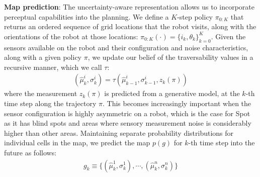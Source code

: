 \documentclass[letterpaper, 10pt, conference]{ieeeconf}      %
\newcommand{\ph}[1]{{\textbf{#1}:}} %
\newcommand{\rev}[1]{{\color{blue}#1}} %
\begin{document}
\ph{Map prediction}
The uncertainty-aware representation allows us to incorporate perceptual capabilities %
into the planning. We define a $K$-step policy \rev{$\pi_{0:K}$ that returns} an ordered sequence of grid locations that the robot visits, along with the orientations of the robot at those locations: \rev{$\pi_{0:K}(\cdot)=\{i_k, \theta_k\}_{k=0}^K$}. Given the sensors available on the robot and their configuration and noise characteristics, along with a given policy $\pi$, we update our belief of the traversability values in a recursive manner, which we call $\tau$:
\begin{align}
 (\hat{\mu}^i_k, \sigma^i_k) =\tau(\hat{\mu}^i_{k-1}, \sigma^i_{k-1}, z_{k}(\pi) )
\end{align}
where the measurement $z_k(\pi)$ is predicted from a generative model, at the $k$-th time step along the trajectory $\pi$. This becomes increasingly important when the sensor configuration is highly asymmetric on a robot, which is the case for Spot as it has blind spots and areas where sensory measurement noise is considerably higher than other areas.
Maintaining separate probability distributions for individual cells in the map, we predict the map $p(g)$ for $k$-th time step into the future as follows: 
\begin{align}
 g_k \equiv \{(\hat{\mu}^1_k,\sigma^1_k),\cdots,(\hat{\mu}^n_k,\sigma^n_k)\}   
\end{align}
\end{document}
